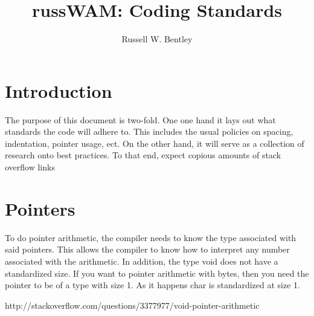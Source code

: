 \documentclass{article}
\begin{document}
\title{russWAM: Coding Standards}
\author{Russell W. Bentley}
\maketitle
\tableofcontents

\section{Introduction}
The purpose of this document is two-fold. One one hand it lays out what standards the code will adhere to. This includes the usual policies on spacing, indentation, pointer usage, ect. On the other hand, it will serve as a collection of research onto best practices. To that end, expect copious amounts of stack overflow links

\section{Pointers}

To do pointer arithmetic, the compiler needs to know the type associated with said pointers. This allows the compiler to know how to interpret any number associated with the arithmetic. In addition, the type void does not have a standardized size. If you want to pointer arithmetic with bytes, then you need the pointer to be of a type with size 1. As it happens char is standardized at size 1. 

http://stackoverflow.com/questions/3377977/void-pointer-arithmetic  
\end{document}

